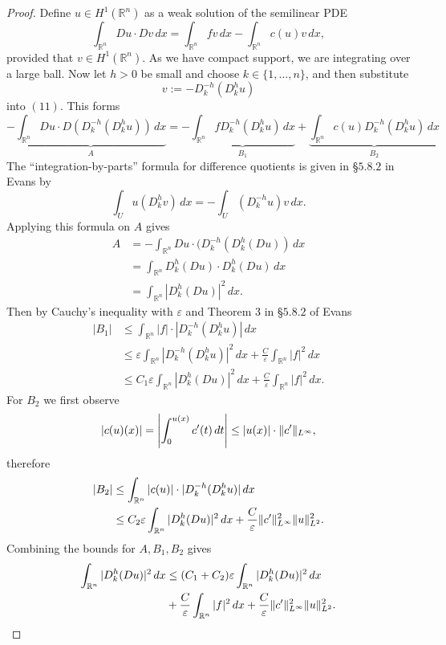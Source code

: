 \documentclass{article}
\DeclarePairedDelimiter{\norm}{\lVert}{\rVert}
\begin{document}
\begin{flushleft}
\begin{proof}
Define $u\in H^1(\mathbb R^n)$ as a weak solution of the semilinear PDE 
\begin{equation}
\int_{\mathbb R^n} Du\cdot Dv \,dx = \int_{\mathbb R^n} fv\,dx - \int_{\mathbb R^n} c(u)v\,dx,
\end{equation}
provided that $v\in H^1(\mathbb R^n).$ As we have compact support, we are integrating over a large ball. Now let $h>0$ be small and choose $k\in\{1,\ldots,n\}$, and then substitute
$$v:=-D_k^{-h}(D_k^hu)$$
into $(11)$. This forms
\begin{equation*}
    -\underbrace{\int_{\mathbb R^n}Du\cdot D(D_k^{-h}(D_k^h u))\,dx}_{A} = -\underbrace{\int_{\mathbb R^n}fD_k^{-h}(D_k^hu)\,dx}_{B_1} + \underbrace{\int_{\mathbb R^n}c(u)D_k^{-h}(D_k^hu)\,dx}_{B_2}
\end{equation*}
The ``integration-by-parts'' formula for difference quotients is given in §$5.8.2$ in Evans by
$$\int_U u(D_k^h v)\,dx = -\int_U (D_k^{-h}u)v\,dx.$$
Applying this formula on $A$ gives
\begin{align*}
    A&=-\int_{\mathbb R^n} Du\cdot (D_k^{-h}(D_k^h(Du))\,dx \\&=
    \int_{\mathbb R^n} D_k^h(Du)\cdot D_k^h(Du)\,dx \\&=
    \int_{\mathbb R^n} |D_k^h(Du)|^2\,dx.
\end{align*}
Then by Cauchy's inequality with $\varepsilon$ and Theorem $3$ in §$5.8.2$ of Evans
\begin{align*}
|B_1| &\le \int_{\mathbb R^n} |f|\cdot|D_k^{-h}(D_k^hu)|\,dx \\&\le
\varepsilon\int_{\mathbb R^n} |D_k^{-h}(D_k^hu)|^2\,dx + \frac{C}{\varepsilon}\int_{\mathbb R^n} |f|^2\,dx \\&\le
C_1 \varepsilon \int_{\mathbb R^n} |D_k^h(Du)|^2\,dx+ \frac{C}{\varepsilon}\int_{\mathbb R^n} |f|^2\,dx.
\end{align*}
For $B_2$ we first observe
$$|c(u)(x)| = \left|\int_0^{u(x)} c'(t)\,dt \right|\le |u(x)|\cdot\norm{c'}_{L^{\infty}},$$
therefore
\begin{align*}
|B_2| &\le \int_{\mathbb R^n} |c(u)|\cdot|D_k^{-h}(D_k^hu)|\,dx \\&\le
C_2 \varepsilon \int_{\mathbb R^n} |D_k^h(Du)|^2\,dx+ \frac{C}{\varepsilon}\norm{c'}_{L^{\infty}}^2 \norm{u}_{L^2}^2.
\end{align*}
Combining the bounds for $A,B_1,B_2$ gives
\begin{align*}\int_{\mathbb R^n} |D_k^h(Du)|^2\,dx &\le (C_1+C_2)\varepsilon\int_{\mathbb R^n} |D_k^h(Du)|^2\,dx \\ &+\frac{C}{\varepsilon}\int_{\mathbb R^n} |f|^2\,dx + \frac{C}{\varepsilon}\norm{c'}_{L^{\infty}}^2 \norm{u}_{L^2}^2.

\end{align*}
\end{proof}
\end{flushleft}
\end{document}
